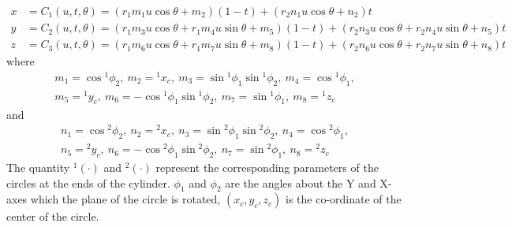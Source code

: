 \documentclass[12pt,a4]{article}
\begin{document}
\begin{align}
x & = C_1(u,t,\theta)=\left(r_1m_1u\cos\theta +m_2 \right)\left(1-t \right)+\left(r_2n_1u\cos\theta+n_2 \right)t\\
y & = C_2(u,t,\theta)=\left(r_1m_3u\cos\theta +r_1m_4u\sin\theta +m_5 \right)\left(1-t \right)+\left(r_2n_3u\cos\theta+r_2n_4u\sin\theta+n_5 \right)t\\
z & = C_3(u,t,\theta)=\left(r_1m_6u\cos\theta +r_1m_7u\sin\theta +m_8 \right)\left(1-t \right)+\left(r_2n_6u\cos\theta+r_2n_7u\sin\theta+n_8 \right)t
\end{align}
where
\begin{align*}
m_1 = \cos{}^1\phi_2,~m_2 = {}^1x_c,~m_3 = \sin{}^1\phi_1\sin{}^1\phi_2,~m_4=\cos{}^1\phi_1, \nonumber \\
m_5 = {}^1y_c,~m_6=-\cos{}^1\phi_1\sin{}^1\phi_2,~m_7=\sin{}^1\phi_1,~m_8={}^1z_c \nonumber
\end{align*}
and
\begin{align*}
n_1 = \cos{}^2\phi_2,~n_2 = {}^2x_c,~n_3 = \sin{}^2\phi_1\sin{}^2\phi_2,~n_4=\cos{}^2\phi_1, \nonumber \\
n_5 = {}^2y_c,~n_6=-\cos{}^2\phi_1\sin{}^2\phi_2,~n_7=\sin{}^2\phi_1,~n_8={}^2z_c \nonumber
\end{align*}
The quantity ${}^1\left(\cdot\right)$ and ${}^2\left(\cdot\right)$ represent the corresponding parameters of the circles at the ends of the cylinder. $\phi_1$ and $\phi_2$ are the angles about the Y and X-axes which the plane of the circle is rotated, $(x_c,y_c,z_c)$ is the co-ordinate of the center of the circle.
\end{document}
